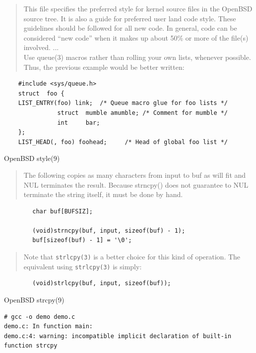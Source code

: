 \documentclass[Screen16to9,17pt]{foils}
\begin{document}

\begin{quote}
This file specifies the preferred style for kernel source files in the
OpenBSD source tree.  It is also a guide for preferred user land code
style.  These guidelines should be followed for all new code.  In general,
code can be considered ``new code'' when it makes up about 50\% or
more of the file(s) involved. ...\\
Use queue(3) macros rather than rolling your own lists, whenever possible.
Thus, the previous example would be better written:
\end{quote}

\begin{verbatim}
    #include <sys/queue.h>
    struct  foo {
    LIST_ENTRY(foo) link;  /* Queue macro glue for foo lists */
               struct  mumble amumble; /* Comment for mumble */
               int     bar;
    };
    LIST_HEAD(, foo) foohead;     /* Head of global foo list */
\end{verbatim}


OpenBSD style(9)


\begin{quote}
The following copies as many characters from input to buf as will fit and
NUL terminates the result.  Because strncpy() does not guarantee to NUL
terminate the string itself, it must be done by hand.
\end{quote}

\begin{verbatim}
        char buf[BUFSIZ];

        (void)strncpy(buf, input, sizeof(buf) - 1);
        buf[sizeof(buf) - 1] = '\0';
\end{verbatim}

\begin{quote}
Note that \verb+strlcpy(3)+ is a better choice for this kind of operation.  The
equivalent using \verb+strlcpy(3)+ is simply:
\end{quote}
\begin{verbatim}
        (void)strlcpy(buf, input, sizeof(buf));
\end{verbatim}

OpenBSD strcpy(9)


\begin{verbatim}
# gcc -o demo demo.c
demo.c: In function main:
demo.c:4: warning: incompatible implicit declaration of built-in
function strcpy
\end{verbatim}
\end{document}

